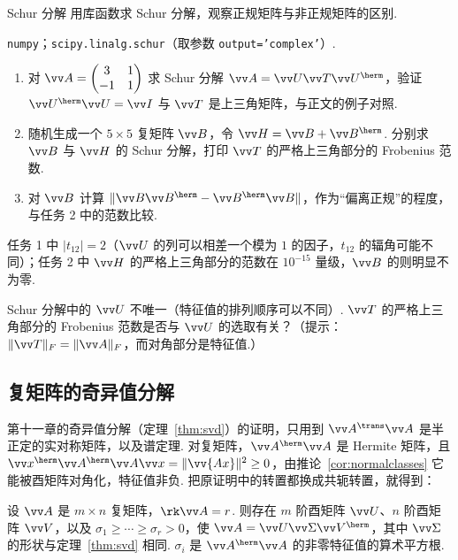 	\begin{codebox}{Schur 分解}
		 用库函数求 Schur 分解，观察正规矩阵与非正规矩阵的区别.
		
		 \texttt{numpy}；\texttt{scipy.linalg.schur}（取参数 \texttt{output='complex'}）.
		
		\begin{enumerate}
			\item 对 $\vv A=\begin{pmatrix}3&1\\-1&1\end{pmatrix}$ 求 Schur 分解 $\vv A=\vv U\vv T\vv U^\herm$，验证 $\vv U^\herm\vv U=\vv I$ 与 $\vv T$ 是上三角矩阵，与正文的例子对照.
			\item 随机生成一个 $5\times5$ 复矩阵 $\vv B$，令 $\vv H=\vv B+\vv B^\herm$. 分别求 $\vv B$ 与 $\vv H$ 的 Schur 分解，打印 $\vv T$ 的严格上三角部分的 Frobenius 范数.
			\item 对 $\vv B$ 计算 $\|\vv B\vv B^\herm-\vv B^\herm\vv B\|$，作为“偏离正规”的程度，与任务 2 中的范数比较.
		\end{enumerate}
		
		 任务 1 中 $|t_{12}|=2$（$\vv U$ 的列可以相差一个模为 $1$ 的因子，$t_{12}$ 的辐角可能不同）；任务 2 中 $\vv H$ 的严格上三角部分的范数在 $10^{-15}$ 量级，$\vv B$ 的则明显不为零.
		
		 Schur 分解中的 $\vv U$ 不唯一（特征值的排列顺序可以不同）. $\vv T$ 的严格上三角部分的 Frobenius 范数是否与 $\vv U$ 的选取有关？（提示：$\|\vv T\|_F=\|\vv A\|_F$，而对角部分是特征值.）
	\end{codebox}
	
	\subsection{复矩阵的奇异值分解}
	
	第十一章的奇异值分解（定理~\ref{thm:svd}）的证明，只用到 $\vv A^\trans\vv A$ 是半正定的实对称矩阵，以及谱定理. 对复矩阵，$\vv A^\herm\vv A$ 是 Hermite 矩阵，且 $\vv x^\herm\vv A^\herm\vv A\vv x=\|\vv{Ax}\|^2\ge0$，由推论~\ref{cor:normalclasses} 它能被酉矩阵对角化，特征值非负. 把原证明中的转置都换成共轭转置，就得到：
	
	\begin{theorem}[复矩阵的奇异值分解]\label{thm:complexsvd}
		设 $\vv A$ 是 $m\times n$ 复矩阵，$\rk\vv A=r$. 则存在 $m$ 阶酉矩阵 $\vv U$、$n$ 阶酉矩阵 $\vv V$，以及 $\sigma_1\ge\cdots\ge\sigma_r>0$，使 $\vv A=\vv U\vv\Sigma\vv V^\herm$，其中 $\vv\Sigma$ 的形状与定理~\ref{thm:svd} 相同. $\sigma_i$ 是 $\vv A^\herm\vv A$ 的非零特征值的算术平方根.
	\end{theorem}
	
